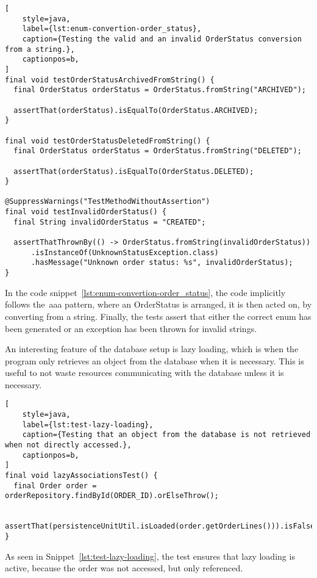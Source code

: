 \begin{lstlisting}[
    style=java,
    label={lst:enum-convertion-order_status},
    caption={Testing the valid and an invalid OrderStatus conversion from a string.},
    captionpos=b,
]
final void testOrderStatusArchivedFromString() {
  final OrderStatus orderStatus = OrderStatus.fromString("ARCHIVED");

  assertThat(orderStatus).isEqualTo(OrderStatus.ARCHIVED);
}

final void testOrderStatusDeletedFromString() {
  final OrderStatus orderStatus = OrderStatus.fromString("DELETED");

  assertThat(orderStatus).isEqualTo(OrderStatus.DELETED);
}

@SuppressWarnings("TestMethodWithoutAssertion")
final void testInvalidOrderStatus() {
  final String invalidOrderStatus = "CREATED";

  assertThatThrownBy(() -> OrderStatus.fromString(invalidOrderStatus))
      .isInstanceOf(UnknownStatusException.class)
      .hasMessage("Unknown order status: %s", invalidOrderStatus);
}
\end{lstlisting}

In the code snippet~\ref{lst:enum-convertion-order_status}, the code implicitly follows the~\acrshort{aaa} pattern,
where an OrderStatus is arranged, it is then acted on, by converting from a string.
Finally, the tests assert that either the correct enum has been generated or an exception has been thrown for invalid
strings.

An interesting feature of the database setup is lazy loading, which is when the program only retrieves an object from
the database when it is necessary.
This is useful to not waste resources communicating with the database unless it is necessary.

\begin{lstlisting}[
    style=java,
    label={lst:test-lazy-loading},
    caption={Testing that an object from the database is not retrieved when not directly accessed.},
    captionpos=b,
]
final void lazyAssociationsTest() {
  final Order order = orderRepository.findById(ORDER_ID).orElseThrow();

  assertThat(persistenceUnitUtil.isLoaded(order.getOrderLines())).isFalse();
}
\end{lstlisting}

As seen in Snippet~\ref{lst:test-lazy-loading}, the test ensures that lazy loading is active, because the order was not
accessed, but only referenced.

